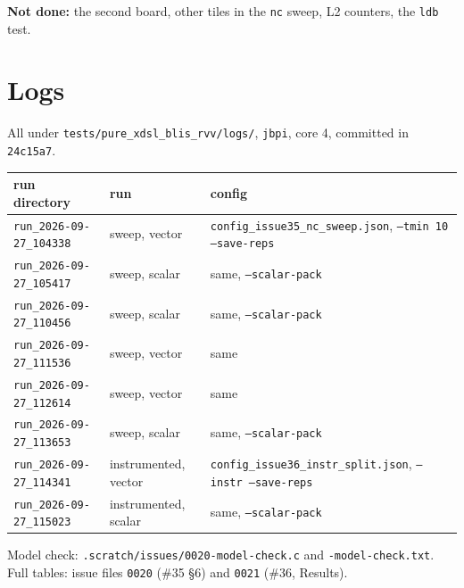 \documentclass[10pt,a4paper]{article}
\begin{document}
\textbf{Not done:} the second board, other tiles in the \texttt{nc} sweep, L2 counters, the \texttt{ldb} test.

\appendix
\section{Logs}
All under \texttt{tests/pure\_xdsl\_blis\_rvv/logs/}, \texttt{jbpi}, core 4, committed in \texttt{24c15a7}.
\begin{center}\small
\begin{tabular}{lll}
\toprule
run directory & run & config \\
\midrule
\texttt{run\_2026-09-27\_104338} & sweep, vector & \texttt{config\_issue35\_nc\_sweep.json}, \texttt{--tmin 10 --save-reps} \\
\texttt{run\_2026-09-27\_105417} & sweep, scalar & same, \texttt{--scalar-pack} \\
\texttt{run\_2026-09-27\_110456} & sweep, scalar & same, \texttt{--scalar-pack} \\
\texttt{run\_2026-09-27\_111536} & sweep, vector & same \\
\texttt{run\_2026-09-27\_112614} & sweep, vector & same \\
\texttt{run\_2026-09-27\_113653} & sweep, scalar & same, \texttt{--scalar-pack} \\
\texttt{run\_2026-09-27\_114341} & instrumented, vector & \texttt{config\_issue36\_instr\_split.json}, \texttt{--instr --save-reps} \\
\texttt{run\_2026-09-27\_115023} & instrumented, scalar & same, \texttt{--scalar-pack} \\
\bottomrule
\end{tabular}
\end{center}
Model check: \texttt{.scratch/issues/0020-model-check.c} and \texttt{-model-check.txt}. Full tables: issue files
\texttt{0020} (\#35 \S6) and \texttt{0021} (\#36, Results).
\end{document}
